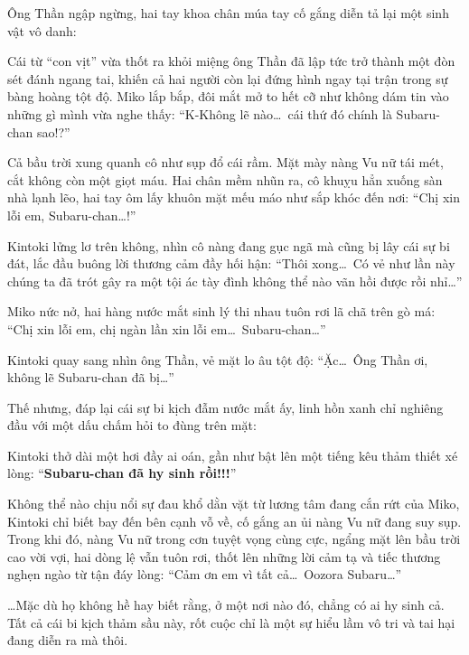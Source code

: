 \documentclass[../main.tex]{subfiles}
\begin{document}
Ông Thần ngập ngừng, hai tay khoa chân múa tay cố gắng diễn tả lại một sinh vật vô danh:


Cái từ ``con vịt'' vừa thốt ra khỏi miệng ông Thần đã lập tức trở thành một đòn sét đánh ngang tai, khiến cả hai người còn lại đứng hình ngay tại trận trong sự bàng hoàng tột độ. Miko lắp bắp, đôi mắt mở to hết cỡ như không dám tin vào những gì mình vừa nghe thấy: ``K-Không lẽ nào\dots\ cái thứ đó chính là Subaru-chan sao!?''


Cả bầu trời xung quanh cô như sụp đổ cái rầm. Mặt mày nàng Vu nữ tái mét, cắt không còn một giọt máu. Hai chân mềm nhũn ra, cô khuỵu hẳn xuống sàn nhà lạnh lẽo, hai tay ôm lấy khuôn mặt mếu máo như sắp khóc đến nơi: ``Chị xin lỗi em, Subaru-chan\dots!''


Kintoki lửng lơ trên không, nhìn cô nàng đang gục ngã mà cũng bị lây cái sự bi đát, lắc đầu buông lời thương cảm đầy hối hận: ``Thôi xong\dots\ Có vẻ như lần này chúng ta đã trót gây ra một tội ác tày đình không thể nào vãn hồi được rồi nhỉ\dots''

Miko nức nở, hai hàng nước mắt sinh lý thi nhau tuôn rơi lã chã trên gò má: ``Chị xin lỗi em, chị ngàn lần xin lỗi em\dots\ Subaru-chan\dots''

Kintoki quay sang nhìn ông Thần, vẻ mặt lo âu tột độ: ``Ặc\dots\ Ông Thần ơi, không lẽ Subaru-chan đã bị\dots''

Thế nhưng, đáp lại cái sự bi kịch đẫm nước mắt ấy, linh hồn xanh chỉ nghiêng đầu với một dấu chấm hỏi to đùng trên mặt:


Kintoki thở dài một hơi đầy ai oán, gần như bật lên một tiếng kêu thảm thiết xé lòng: ``\textbf{Subaru-chan đã hy sinh rồi!!!}''

Không thể nào chịu nổi sự đau khổ dằn vặt từ lương tâm đang cắn rứt của Miko, Kintoki chỉ biết bay đến bên cạnh vỗ về, cố gắng an ủi nàng Vu nữ đang suy sụp. Trong khi đó, nàng Vu nữ trong cơn tuyệt vọng cùng cực, ngẩng mặt lên bầu trời cao vời vợi, hai dòng lệ vẫn tuôn rơi, thốt lên những lời cảm tạ và tiếc thương nghẹn ngào từ tận đáy lòng: ``Cảm ơn em vì tất cả\dots\ Oozora Subaru\dots''


\dots Mặc dù họ không hề hay biết rằng, ở một nơi nào đó, chẳng có ai hy sinh cả. Tất cả cái bi kịch thảm sầu này, rốt cuộc chỉ là một sự hiểu lầm vô tri và tai hại đang diễn ra mà thôi.
\end{document}
